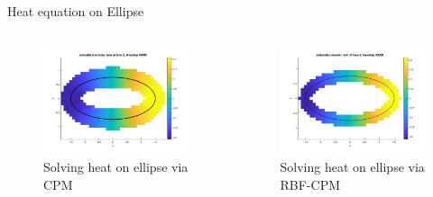 \documentclass{beamer}
\begin{document}
\begin{frame}{Heat equation on Ellipse}
    \begin{columns}
        \begin{figure}
            \centering
            \includegraphics[width=1\textwidth]{UBC_IAM_5min_talk/Figures/heat_ellipse/heat_ellipse_CPM_plotdomain_a15b075.png}
            \caption{Solving heat on ellipse via CPM}
        \end{figure}
        \begin{figure}
            \centering
            \includegraphics[width=1\textwidth]{UBC_IAM_5min_talk/Figures/heat_ellipse/heat_ellipse_RBFCPM_plotdomain_a15b075.png}
            \caption{Solving heat on ellipse via RBF-CPM}
        \end{figure}
    \end{columns}
\end{frame}
\end{document}
